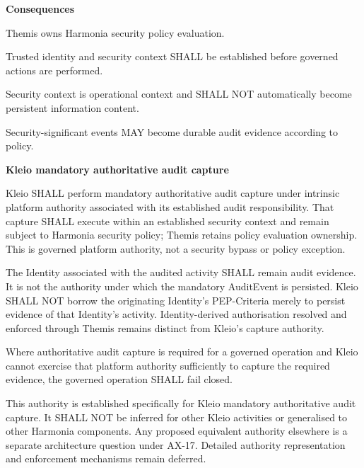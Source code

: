 \par\medskip\textbf{Consequences}\par


Themis owns Harmonia security policy evaluation.



Trusted identity and security context SHALL be established before
governed actions are performed.



Security context is operational context and SHALL NOT automatically
become persistent information content.



Security-significant events MAY become durable audit evidence according
to policy.







\par\medskip\textbf{Kleio mandatory authoritative audit capture}\par


Kleio SHALL perform mandatory authoritative audit capture under intrinsic
platform authority associated with its established audit responsibility.
That capture SHALL execute within an established security context and remain
subject to Harmonia security policy; Themis retains policy evaluation ownership.
This is governed platform authority, not a security bypass or policy exception.



The Identity associated with the audited activity SHALL remain audit evidence.
It is not the authority under which the mandatory AuditEvent is persisted.
Kleio SHALL NOT borrow the originating Identity's PEP-Criteria merely to persist
evidence of that Identity's activity. Identity-derived authorisation resolved
and enforced through Themis remains distinct from Kleio's capture authority.



Where authoritative audit capture is required for a governed operation and
Kleio cannot exercise that platform authority sufficiently to capture the
required evidence, the governed operation SHALL fail closed.



This authority is established specifically for Kleio mandatory authoritative
audit capture. It SHALL NOT be inferred for other Kleio activities or generalised
to other Harmonia components. Any proposed equivalent authority elsewhere is
a separate architecture question under AX-17. Detailed authority representation
and enforcement mechanisms remain deferred.



